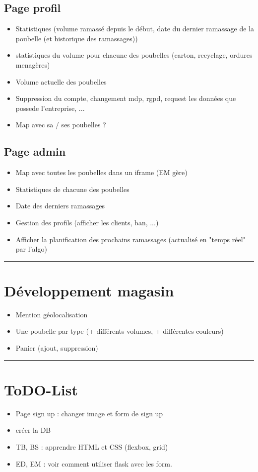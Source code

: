 \documentclass[10pt,a4paper]{report}
\begin{document}
\subsection{Page profil}
\begin{itemize}
        \item Statistiques (volume ramassé depuis le début, date du dernier ramassage de la poubelle (et historique des ramassages))
        \item statistiques du volume pour chacune des poubelles (carton, recyclage, ordures menagères)
        \item Volume actuelle des poubelles
        \item Suppression du compte, changement mdp, rgpd, request les données que possede l'entreprise, ...
        \item Map avec sa / ses poubelles ?
\end{itemize}

\subsection{Page admin}
\begin{itemize}
        \item Map avec toutes les poubelles dans un iframe (EM gère)
        \item Statistiques de chacune des poubelles
        \item Date des derniers ramassages
        \item Gestion des profils (afficher les clients, ban, ...)
        \item Afficher la planification des prochains ramassages (actualisé en "temps réel" par l'algo)
\end{itemize}



\rule{\linewidth}{0.5mm} \bigskip
\section{Développement magasin}
\begin{itemize}
        \item Mention géolocalisation 
        \item Une poubelle par type (+ différents volumes, + différentes couleurs) 
        \item Panier (ajout, suppression)
\end{itemize}


\rule{\linewidth}{0.5mm} \bigskip
\section{ToDO-List}
\begin{itemize}
        \item Page sign up : changer image et form de sign up 
        \item créer la DB
        \item TB, BS : apprendre HTML et CSS (flexbox, grid)
        \item ED, EM : voir comment utiliser flask avec les form.
\end{itemize}
\end{document}
